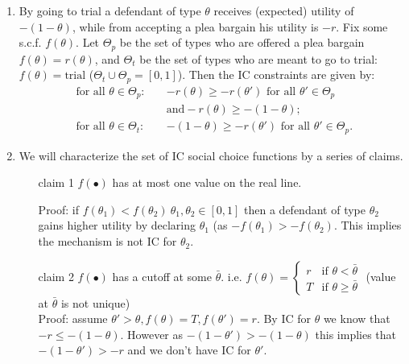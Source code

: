 \documentclass[a4paper]{article}
\begin{document}
	\begin{enumerate}
		\item By going to trial a defendant of type $\theta$ receives (expected) utility of $-(1-\theta)$, while from accepting a plea bargain his utility is $-r$. 
		Fix some s.c.f. $f(\theta)$. Let $\Theta_p$ be the set of types who are offered a plea bargain $f(\theta) = r(\theta)$, and $\Theta_t$ be the set of types who are meant to go to trial: $f(\theta) = \text{trial}$ ($\Theta_t \cup \Theta_p = [0,1]$). Then the IC constraints are given by:
		\begin{align*}
			\text{ for all } \theta \in \Theta_p: \quad&-r(\theta) \geq -r(\theta') \text{ for all } \theta' \in \Theta_p
			\\
			& \text{and}  -r(\theta) \geq -(1-\theta);
			\\
			\text{ for all } \theta \in \Theta_t: \quad& -(1-\theta) \geq -r(\theta') \text{ for all } \theta' \in \Theta_p.
		\end{align*}
		
		
		\item We will characterize the set of IC social choice functions by a series of claims. 
		
		\begin{itemize}
			\item[claim 1] $f(\bullet)$ has at most one value on the real line.
			
			Proof: if $f(\theta_1)<f(\theta_2) ~\theta_1,\theta_2 \in [0,1]$ then a defendant of type $\theta_2$ gains higher utility by declaring $\theta_1$ (as $-f(\theta_1)>-f(\theta_2)$. This implies the mechanism is not IC for $\theta_2$.
			
			\item[claim 2] $f(\bullet)$ has a cutoff at some $\bar{\theta}$. i.e. $f(\theta)= \begin{cases} r & \text{if } \theta<\bar{\theta}
				\\
				T & \text{if } \theta\geq\bar{\theta} \end{cases}$ (value at $\bar{\theta}$ is not unique)\\
			
			Proof: assume $\theta'>\theta , f(\theta)=T, f(\theta')=r$. By IC for $\theta$ we know that $-r\leq -(1-\theta)$. However as $-(1-\theta')>-(1-\theta)$ this implies that $-(1-\theta')>-r$ and we don't have IC for $\theta'$.
			

\end{itemize}
\end{enumerate}
\end{document}
